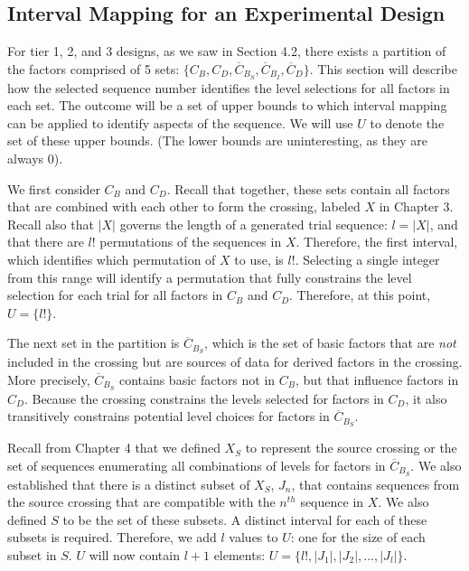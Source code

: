 \subsection{Interval Mapping for an Experimental Design}

For tier 1, 2, and 3 designs, as we saw in Section 4.2, there exists a partition of the factors comprised of 5 sets: $\{C_B, C_D, \overline{C}_{B_S}, \overline{C}_{B_I}, \overline{C}_D\}$. This section will describe how the selected sequence number identifies the level selections for all factors in each set. The outcome will be a set of upper bounds to which interval mapping can be applied to identify aspects of the sequence. We will use $U$ to denote the set of these upper bounds. (The lower bounds are uninteresting, as they are always $0$).

We first consider $C_B$ and $C_D$. Recall that together, these sets contain all factors that are combined with each other to form the crossing, labeled $X$ in Chapter 3. Recall also that $|X|$ governs the length of a generated trial sequence: $l = |X|$, and that there are $l!$ permutations of the sequences in $X$. Therefore, the first interval, which identifies which permutation of $X$ to use, is $l!$. Selecting a single integer from this range will identify a permutation that fully constrains the level selection for each trial for all factors in $C_B$ and $C_D$. Therefore, at this point, $U = \{l!\}$.

The next set in the partition is $\overline{C}_{B_S}$, which is the set of basic factors that are \textit{not} included in the crossing but are sources of data for derived factors in the crossing. More precisely, $\overline{C}_{B_S}$ contains basic factors not in $C_B$, but that influence factors in $C_D$. Because the crossing constrains the levels selected for factors in $C_D$, it also transitively constrains potential level choices for factors in $\overline{C}_{B_S}$.

Recall from Chapter 4 that we defined $X_S$ to represent the source crossing or the set of sequences enumerating all combinations of levels for factors in $\overline{C}_{B_S}$. We also established that there is a distinct subset of $X_S$, $J_n$, that contains sequences from the source crossing that are compatible with the $n^{th}$ sequence in $X$. We also defined $S$ to be the set of these subsets. A distinct interval for each of these subsets is required. Therefore, we add $l$ values to $U$: one for the size of each subset in $S$. $U$ will now contain $l + 1$ elements: $U = \{l!, |J_1|, |J_2|, ..., |J_l|\}$.

